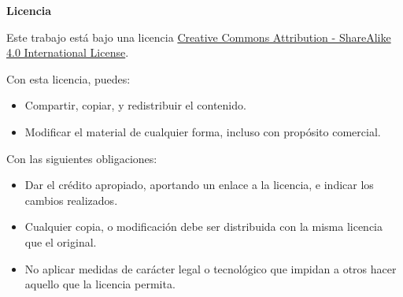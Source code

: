 \thispagestyle{empty}

\hfill

\vfill

\textbf{Licencia} \ccbysa

Este trabajo está bajo una licencia \hyperlink{https://creativecommons.org/licenses/by-sa/4.0/legalcode}{Creative Commons Attribution - ShareAlike 4.0 International License}.

Con esta licencia, puedes:
\begin{itemize}
	\item  Compartir, copiar, y redistribuir el contenido.
	\item  Modificar el material de cualquier forma, incluso con propósito comercial.
\end{itemize}

Con las siguientes obligaciones:
\begin{itemize}
	\item[\ccAttribution] Dar el crédito apropiado, aportando un enlace a la licencia, e indicar los cambios realizados. 
	\item[\ccShareAlike] Cualquier copia, o modificación debe ser distribuida con la misma licencia que el original.
	\item[] No aplicar medidas de carácter legal o tecnológico que impidan a otros hacer aquello que la licencia permita.
\end{itemize}
\clearpage
